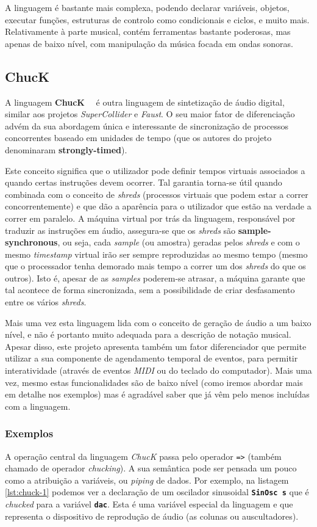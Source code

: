 A linguagem é bastante mais complexa, podendo declarar variáveis, objetos, executar funções, estruturas de controlo como condicionais e ciclos, e muito mais. Relativamente à parte musical, contém ferramentas bastante poderosas, mas apenas de baixo nível, com manipulação da música focada em ondas sonoras.

\subsection{ChucK}
A linguagem \textbf{ChucK}~\citep{doi:Chuck}~\citep{wang2003chuck} é outra linguagem de sintetização de áudio digital, similar aos projetos \textit{SuperCollider} e \textit{Faust}. O seu maior fator de diferenciação advém da sua abordagem única e interessante de sincronização de processos concorrentes baseado em unidades de tempo (que os autores do projeto denominaram \textbf{strongly-timed}).

Este conceito significa que o utilizador pode definir tempos virtuais associados a quando certas instruções devem ocorrer. Tal garantia torna-se útil quando combinada com o conceito de \textit{shreds} (processos virtuais que podem estar a correr concorrentemente) e que dão a aparência para o utilizador que estão na verdade a correr em paralelo. A máquina virtual por trás da linguagem, responsável por traduzir as instruções em áudio, assegura-se que os \textit{shreds} são \textbf{sample-synchronous}, ou seja, cada \textit{sample} (ou amostra) geradas pelos \textit{shreds} e com o mesmo \textit{timestamp} virtual irão ser sempre reproduzidas ao mesmo tempo (mesmo que o processador tenha demorado mais tempo a correr um dos \textit{shreds} do que os outros). Isto é, apesar de as \textit{samples} poderem-se atrasar, a máquina garante que tal acontece de forma sincronizada, sem a possibilidade de criar desfasamento entre os vários \textit{shreds}.

Mais uma vez esta linguagem lida com o conceito de geração de áudio a um baixo nível, e não é portanto muito adequada para a descrição de notação musical. Apesar disso, este projeto apresenta também um fator diferenciador que permite utilizar a sua componente de agendamento temporal de eventos, para permitir interatividade (através de eventos \textit{MIDI} ou do teclado do computador). Mais uma vez, mesmo estas funcionalidades são de baixo nível (como iremos abordar mais em detalhe nos exemplos) mas é agradável saber que já vêm pelo menos incluídas com a linguagem.

\subsubsection{Exemplos}
A operação central da linguagem \textit{ChucK} passa pelo operador \texttt{=>} (também chamado de operador \textit{chucking}). A sua semântica pode ser pensada um pouco como a atribuição a variáveis, ou \textit{piping} de dados. Por exemplo, na listagem \ref{lst:chuck-1} podemos ver a declaração de um oscilador sinusoidal \textbf{\texttt{SinOsc s}} que é \textit{chucked} para a variável \textbf{\texttt{dac}}. Esta é uma variável especial da linguagem e que representa o dispositivo de reprodução de áudio (as colunas ou auscultadores).

